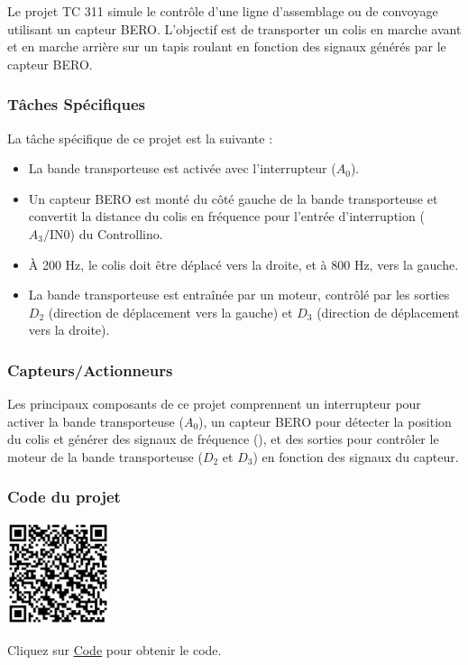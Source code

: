 \documentclass[a4paper,12pt]{report}
\begin{document}
Le projet TC 311 simule le contrôle d'une ligne d'assemblage ou de convoyage utilisant un capteur BERO. L'objectif est de transporter un colis en marche avant et en marche arrière sur un tapis roulant en fonction des signaux générés par le capteur BERO.

\subsubsection{Tâches Spécifiques}

La tâche spécifique de ce projet est la suivante :
\begin{itemize}
    \item La bande transporteuse est activée avec l'interrupteur (\(A_0\)).
    \item Un capteur BERO est monté du côté gauche de la bande transporteuse et convertit la distance du colis en fréquence pour l'entrée d'interruption (\(A_3 / \text{IN0}\)) du Controllino.
    \item À 200 Hz, le colis doit être déplacé vers la droite, et à 800 Hz, vers la gauche.
    \item La bande transporteuse est entraînée par un moteur, contrôlé par les sorties \(D_2\) (direction de déplacement vers la gauche) et \(D_3\) (direction de déplacement vers la droite).
\end{itemize}

\subsubsection{Capteurs/Actionneurs}

Les principaux composants de ce projet comprennent un interrupteur pour activer la bande transporteuse (\(A_0\)), un capteur BERO pour détecter la position du colis et générer des signaux de fréquence (), et des sorties pour contrôler le moteur de la bande transporteuse (\(D_2\) et \(D_3\)) en fonction des signaux du capteur.

\subsubsection{Code du projet}

\begin{minipage}{0.5\textwidth}
    \includegraphics[height=3cm]{Code TC311.png}
\end{minipage}%
\begin{minipage}{0.5\textwidth}
    Cliquez sur \href{https://github.com/DexterTaha/Controllino-PLC-Sample/blob/main/TC300/TC311_Ligne_d'assemblage_Bero/TC311_Ligne_d'assemblage_Bero.ino}{Code} pour obtenir le code.
\end{minipage}
\end{document}
